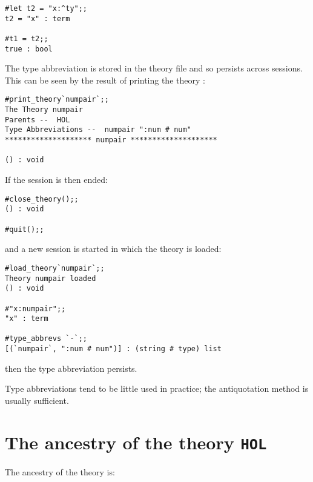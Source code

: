 {{\begin{session}
\begin{verbatim}
#let t2 = "x:^ty";;
t2 = "x" : term

#t1 = t2;;
true : bool
\end{verbatim}\end{session}

\pagebreak[2]

\noindent The type abbreviation is stored in the theory file and so
persists across sessions. This can be seen by the result of printing
the theory :

\begin{session}\begin{verbatim}
#print_theory`numpair`;;
The Theory numpair
Parents --  HOL     
Type Abbreviations --  numpair ":num # num"     
******************** numpair ********************

() : void
\end{verbatim}\end{session}

\noindent If the session is then ended: 

\begin{session}\begin{verbatim}
#close_theory();;
() : void

#quit();;
\end{verbatim}\end{session}

\noindent and a new session is started in which the theory  is
loaded:

\setcounter{sessioncount}{1}
\begin{session}\begin{verbatim}
#load_theory`numpair`;;
Theory numpair loaded
() : void

#"x:numpair";;
"x" : term

#type_abbrevs `-`;;
[(`numpair`, ":num # num")] : (string # type) list
\end{verbatim}\end{session}

\noindent then the type abbreviation persists.

Type abbreviations tend to be little used in practice; the antiquotation
method is usually sufficient.

\section{The ancestry of the theory {\tt HOL}}
\label{HOL-ancestry}

The ancestry
of the theory  is:

}}
